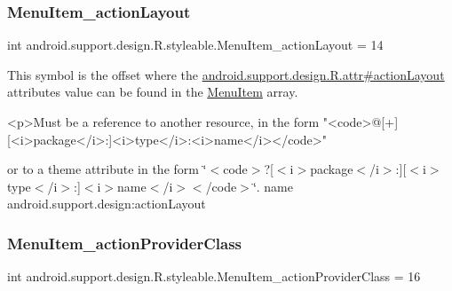 \mbox{\label{classandroid_1_1support_1_1design_1_1R_1_1styleable_ac3b8f7bd30f9bc1ac057760201dfb65d}} 
\subsubsection{\texorpdfstring{Menu\+Item\+\_\+action\+Layout}{MenuItem\_actionLayout}}
{\footnotesize\ttfamily int android.\+support.\+design.\+R.\+styleable.\+Menu\+Item\+\_\+action\+Layout = 14\hspace{0.3cm}{\ttfamily [static]}}

This symbol is the offset where the \hyperlink{classandroid_1_1support_1_1design_1_1R_1_1attr_a5dd4eba3b7ab21a3ccd2091e9c0ad8e2}{android.\+support.\+design.\+R.\+attr\#action\+Layout} attribute\textquotesingle{}s value can be found in the \hyperlink{classandroid_1_1support_1_1design_1_1R_1_1styleable_a4c90afdbb461f2bfba191da26fbc881c}{Menu\+Item} array.

\begin{DoxyVerb}      <p>Must be a reference to another resource, in the form "<code>@[+][<i>package</i>:]<i>type</i>:<i>name</i></code>"
\end{DoxyVerb}
 or to a theme attribute in the form \char`\"{}$<$code$>$?\mbox{[}$<$i$>$package$<$/i$>$\+:\mbox{]}\mbox{[}$<$i$>$type$<$/i$>$\+:\mbox{]}$<$i$>$name$<$/i$>$$<$/code$>$\char`\"{}.  name android.\+support.\+design\+:action\+Layout \mbox{\label{classandroid_1_1support_1_1design_1_1R_1_1styleable_a456f32170b14cb7530deba3660c427af}} 
\subsubsection{\texorpdfstring{Menu\+Item\+\_\+action\+Provider\+Class}{MenuItem\_actionProviderClass}}
{\footnotesize\ttfamily int android.\+support.\+design.\+R.\+styleable.\+Menu\+Item\+\_\+action\+Provider\+Class = 16\hspace{0.3cm}{\ttfamily [static]}}

